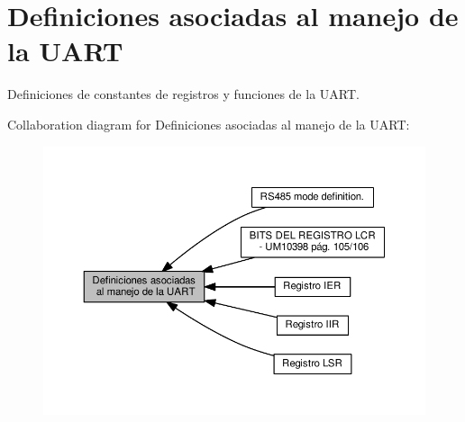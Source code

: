 \hypertarget{group___d_e_f_i_n_e_s_u_a_r_t}{}\section{Definiciones asociadas al manejo de la U\+A\+RT}
\label{group___d_e_f_i_n_e_s_u_a_r_t}


Definiciones de constantes de registros y funciones de la U\+A\+RT.  


Collaboration diagram for Definiciones asociadas al manejo de la U\+A\+RT\+:\nopagebreak
\begin{figure}[H]
\begin{center}
\leavevmode
\includegraphics[width=350pt]{group___d_e_f_i_n_e_s_u_a_r_t}
\end{center}
\end{figure}
